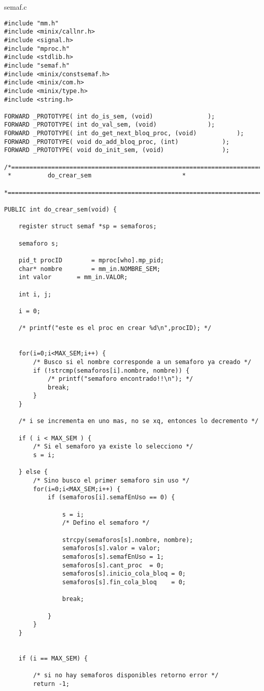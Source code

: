 semaf.c

\begin{verbatim}
#include "mm.h"
#include <minix/callnr.h>
#include <signal.h>
#include "mproc.h"
#include <stdlib.h>
#include "semaf.h"
#include <minix/constsemaf.h>
#include <minix/com.h>
#include <minix/type.h>
#include <string.h>

FORWARD _PROTOTYPE( int do_is_sem, (void)				);
FORWARD _PROTOTYPE( int do_val_sem, (void)				);
FORWARD _PROTOTYPE( int do_get_next_bloq_proc, (void)			);
FORWARD _PROTOTYPE( void do_add_bloq_proc, (int)			);
FORWARD _PROTOTYPE( void do_init_sem, (void)				);

/*===========================================================================*
 *			do_crear_sem					     *
 *===========================================================================*/

PUBLIC int do_crear_sem(void) {

	register struct semaf *sp = semaforos;

	semaforo s;

	pid_t procID		= mproc[who].mp_pid;
	char* nombre		= mm_in.NOMBRE_SEM;
	int valor		= mm_in.VALOR;

	int i, j;

	i = 0;

	/* printf("este es el proc en crear %d\n",procID); */


	for(i=0;i<MAX_SEM;i++) {
		/* Busco si el nombre corresponde a un semaforo ya creado */
		if (!strcmp(semaforos[i].nombre, nombre)) {
			/* printf("semaforo encontrado!!\n"); */
			break;
		}
	}

	/* i se incrementa en uno mas, no se xq, entonces lo decremento */

	if ( i < MAX_SEM ) {
		/* Si el semaforo ya existe lo selecciono */
		s = i;

	} else {
		/* Sino busco el primer semaforo sin uso */
		for(i=0;i<MAX_SEM;i++) {
			if (semaforos[i].semafEnUso == 0) {

				s = i;
				/* Defino el semaforo */

				strcpy(semaforos[s].nombre, nombre);
				semaforos[s].valor = valor;
				semaforos[s].semafEnUso = 1;
				semaforos[s].cant_proc  = 0;
				semaforos[s].inicio_cola_bloq = 0;
				semaforos[s].fin_cola_bloq    = 0;

				break;

			}
		}
	}


	if (i == MAX_SEM) {

		/* si no hay semaforos disponibles retorno error */
		return -1;


\end{verbatim}
